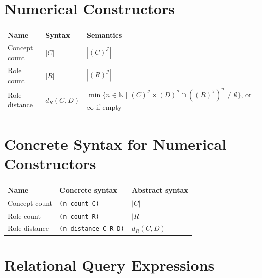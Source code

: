 \documentclass[11pt]{article}
\newcommand{\I}{\mathcal{I}}
\newcommand{\sem}[1]{\left(#1\right)^{\I}}
\newcommand{\Nat}{\mathbb{N}}
\newenvironment{compacttable}
  {\begingroup\setlength{\tabcolsep}{3pt}}
  {\endgroup}
\begin{document}
\section{Numerical Constructors}

\begin{compacttable}
\begin{longtable}{>{\raggedright\arraybackslash}p{}
                  >{\centering\arraybackslash}p{}
                  >{\raggedright\arraybackslash}p{}}
\toprule
Name & Syntax & Semantics \\
\midrule
\endhead

Concept count &
$|C|$ &
$|\sem{C}|$ \\

Role count &
$|R|$ &
$|\sem{R}|$ \\

Role distance &
$d_R(C,D)$ &
$\min\{n \in \Nat \mid \sem{C} \times \sem{D} \cap (\sem{R})^n \neq \emptyset\}$, or $\infty$ if empty \\

\bottomrule
\end{longtable}
\end{compacttable}

\section{Concrete Syntax for Numerical Constructors}

\begin{compacttable}
\begin{longtable}{>{\raggedright\arraybackslash}p{}
                  >{\raggedright\arraybackslash}p{}
                  >{\raggedright\arraybackslash}p{}}
\toprule
Name & Concrete syntax & Abstract syntax \\
\midrule
\endhead
Concept count & \texttt{(n\_count C)} & $|C|$ \\
Role count & \texttt{(n\_count R)} & $|R|$ \\
Role distance & \texttt{(n\_distance C R D)} & $d_R(C,D)$ \\
\bottomrule
\end{longtable}
\end{compacttable}


\section{Relational Query Expressions}
\end{document}
